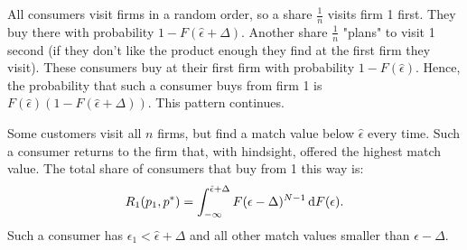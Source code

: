 All consumers visit firms in a random order, so a share $\frac{1}{n}$
visits firm 1 first. They buy there with probability $1-F(\hat\epsilon+\Delta)$.
Another share $\frac{1}{n}$ "plans" to visit 1 second (if they don't
like the product enough they find at the first firm they visit). These
consumers buy at their first firm with probability $1-F(\hat\epsilon)$.
Hence, the probability that such a consumer buys from firm 1 is
$F(\hat\epsilon)(1-F(\hat\epsilon+\Delta))$. This pattern continues.

Some customers visit all $n$ firms, but find a match value below $\hat\epsilon$
every time. Such a consumer returns to the firm that, with hindsight,
offered the highest match value. The total share of consumers that buy
from 1 this way is:
\begin{align}
	R_1(p_1,p^*)=\int_{-\infty}^{\hat\epsilon+\Delta}F(\epsilon-\Delta)^{N-1}\,\textrm{d}F(\epsilon).
\end{align}
Such a consumer has $\epsilon_1<\hat\epsilon+\Delta$ and all other match
values smaller than $\epsilon-\Delta$.

